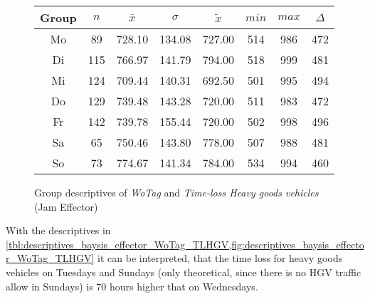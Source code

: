 \begin{figure}[ht!]
	\centering
	\begin{minipage}{0.5\textwidth}
		\tiny
		\setlength{\tabcolsep}{4pt}
		\centering
		\begin{tabular}{c|c|c|c|c|c|c|c}
			\toprule
			Group & $n$ & $\bar{x}$ & $\sigma$ & $\tilde{x}$ & $min$ & $max$ & $\Delta$ \\
			\midrule
			Mo & 89  & 728.10 & 134.08 & 727.00 & 514 & 986 & 472 \\ 
			Di & 115 & 766.97 & 141.79 & 794.00 & 518 & 999 & 481 \\ 
			Mi & 124 & 709.44 & 140.31 & 692.50 & 501 & 995 & 494 \\ 
			Do & 129 & 739.48 & 143.28 & 720.00 & 511 & 983 & 472 \\ 
			Fr & 142 & 739.78 & 155.44 & 720.00 & 502 & 998 & 496 \\ 
			Sa & 65  & 750.46 & 143.80 & 778.00 & 507 & 988 & 481 \\ 
			So & 73  & 774.67 & 141.34 & 784.00 & 534 & 994 & 460 \\ 
			\bottomrule
		\end{tabular}
		\label{tbl:descriptives_baysis_effector_WoTag_TLHGV}
	\end{minipage}%
	\begin{minipage}{0.55\textwidth}
		\data
		\pgfplotstablesort[sort key=mean, sort cmp=float >]{\datasorted}{\data}
		\tiny
		\centering
		\label{fig:descriptives_baysis_effector_WoTag_TLHGV}
	\end{minipage}%
	\caption{Group descriptives of \textit{WoTag} and \textit{Time-loss Heavy goods vehicles} (Jam Effector)}
\end{figure}
With the descriptives in \cref{tbl:descriptives_baysis_effector_WoTag_TLHGV,fig:descriptives_baysis_effector_WoTag_TLHGV} it can be interpreted, that the time loss for heavy goods vehicles on Tuesdays and Sundays (only theoretical, since there is no HGV traffic allow in Sundays) is 70 hours higher that on Wednesdays.

